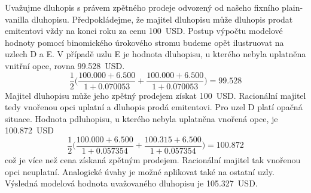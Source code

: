 \documentclass[a4paper]{book}
\begin{document}
Uvažujme dluhopis s právem zpětného prodeje odvozený od našeho fixního plain-vanilla dluhopisu. Předpokládejme, že majitel dluhopisu může dluhopis prodat emitentovi vždy na konci roku za cenu 100~USD. Postup výpočtu modelové hodnoty pomocí binomického úrokového stromu budeme opět ilustruovat na uzlech D a E. V případě uzlu E je hodnota dluhopisu, u kterého nebyla uplatněna vnitřní opce, rovna 99.528~USD.
\begin{equation*}
\frac{1}{2}\Bigg(\frac{100.000 + 6.500}{1 + 0.070053} + \frac{100.000 + 6.500}{1 + 0.070053}\Bigg) = 99.528
\end{equation*}
Majitel dluhopisu může jeho zpětný prodejem získat 100~USD. Racionální majitel tedy vnořenou opci uplatní a dluhopis prodá emitentovi. Pro uzel D platí opačná situace. Hodnota pdluhopisu, u kterého nebyla uplatněna vnořená opce, je 100.872~USD
\begin{equation*}
\frac{1}{2}\Bigg(\frac{100.000 + 6.500}{1 + 0.057354} + \frac{100.315 + 6.500}{1 + 0.057354}\Bigg) = 100.872
\end{equation*}
což je více než cena získaná zpětným prodejem. Racionální majitel tak vnořenou opci neuplatní. Analogické úvahy je možné aplikovat také na ostatní uzly. Výsledná modelová hodnota uvažovaného dluhopisu je 105.327~USD.
\end{document}
